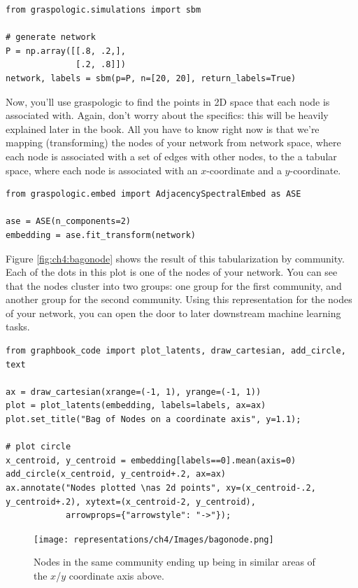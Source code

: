 \begin{lstlisting}[style=python]
from graspologic.simulations import sbm

# generate network
P = np.array([[.8, .2,],
              [.2, .8]])
network, labels = sbm(p=P, n=[20, 20], return_labels=True)
\end{lstlisting}

Now, you'll use graspologic to find the points in 2D space that each node is associated with. Again, don't worry about the specifics: this will be heavily explained later in the book. All you have to know right now is that we're {mapping} (transforming) the nodes of your network from network space, where each node is associated with a set of edges with other nodes, to the a tabular space, where each node is associated with an $x$-coordinate and a $y$-coordinate.

\begin{lstlisting}[style=python]
from graspologic.embed import AdjacencySpectralEmbed as ASE

ase = ASE(n_components=2)
embedding = ase.fit_transform(network)
\end{lstlisting}

Figure \ref{fig:ch4:bagonode} shows the result of this tabularization by community. Each of the dots in this plot is one of the nodes of your network. You can see that the nodes cluster into two groups: one group for the first community, and another group for the second community. Using this representation for the nodes of your network, you can open the door to later downstream machine learning tasks.

\begin{lstlisting}[style=python]
from graphbook_code import plot_latents, draw_cartesian, add_circle, text

ax = draw_cartesian(xrange=(-1, 1), yrange=(-1, 1))
plot = plot_latents(embedding, labels=labels, ax=ax)
plot.set_title("Bag of Nodes on a coordinate axis", y=1.1);

# plot circle
x_centroid, y_centroid = embedding[labels==0].mean(axis=0)
add_circle(x_centroid, y_centroid+.2, ax=ax)
ax.annotate("Nodes plotted \nas 2d points", xy=(x_centroid-.2, y_centroid+.2), xytext=(x_centroid-2, y_centroid), 
            arrowprops={"arrowstyle": "->"});
\end{lstlisting}
\begin{figure}[h]
    \centering
    \texttt{[image: representations/ch4/Images/bagonode.png]}
    \caption{Nodes in the same community ending up being in similar areas of the $x$/$y$ coordinate axis above.}
    \label{fig:bagonode}
\end{figure}

